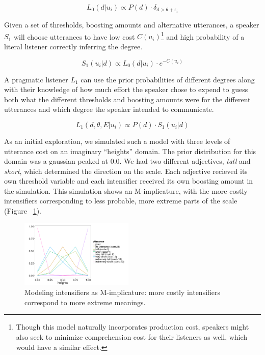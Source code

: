 \documentclass[10pt,letterpaper]{article}
\newcommand{\w}[1]{\emph{#1}}
\begin{document}
\[ L_0(d | u_i) \propto P(d) \cdot \delta_{d > \theta + \epsilon_i } \]

Given a set of thresholds, boosting amounts and alternative utterances, a speaker $S_1$ will choose utterances to have low cost $C(u_i)$\footnote{Though this model naturally incorporates production cost, speakers might also seek to minimize comprehension cost for their listeners as well, which would have a similar effect.}
and high probability of a literal listener correctly inferring the degree.

\[ S_1(u_i | d) \propto L_0(d | u_i) \cdot e^{-C(u_i)} \]

A pragmatic listener $L_1$ can use the prior probabilities of different degrees along with their knowledge of how much effort the speaker chose to expend to guess both what the different thresholds and boosting amounts were for the different utterances and which degree the speaker intended to communicate.

\[ L_1(d, \theta, E | u_i) \propto P(d) \cdot S_1(u_i | d) \]

As an initial exploration, we simulated such a model with three levels of utterance cost on an imaginary ``heights'' domain. The prior distribution for this domain was a gaussian peaked at 0.0.
We had two different adjectives, \w{tall} and \w{short}, which determined the direction on the scale. Each adjective recieved its own threshold variable and each intensifier received its own boosting amount in the simulation. This simulation shows an M-implicature, with the more costly intensifiers corresponding to less probable, more extreme parts of the scale (Figure ~\ref{model}).


\begin{figure}[ht]
\begin{center}
\includegraphics[width=0.48\textwidth]{analysis_files_for_writeup/images/model_results.png}
\end{center}
\caption{Modeling intensifiers as M-implicature: more costly intensifiers correspond to more extreme meanings.} 
\label{model}
\end{figure}
\end{document}
